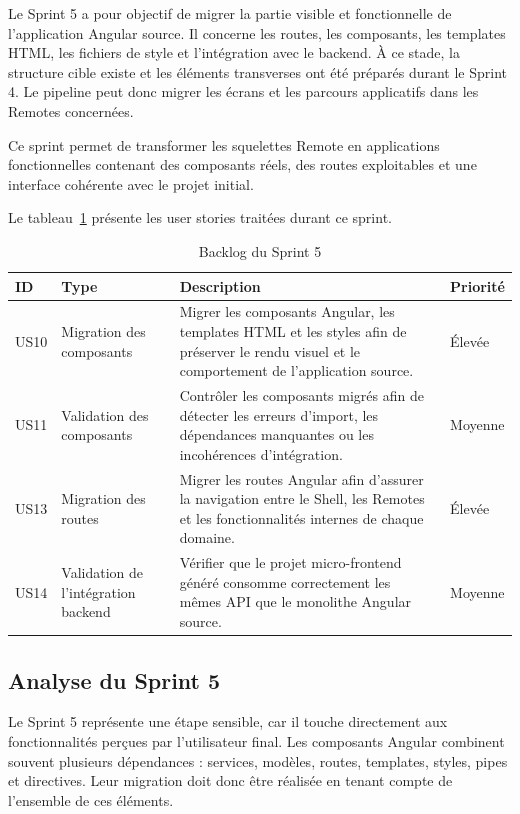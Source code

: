 Le Sprint 5 a pour objectif de migrer la partie visible et fonctionnelle de l'application Angular source. Il concerne les routes, les composants, les templates HTML, les fichiers de style et l'intégration avec le backend. À ce stade, la structure cible existe et les éléments transverses ont été préparés durant le Sprint 4. Le pipeline peut donc migrer les écrans et les parcours applicatifs dans les Remotes concernées.

Ce sprint permet de transformer les squelettes Remote en applications fonctionnelles contenant des composants réels, des routes exploitables et une interface cohérente avec le projet initial.

Le tableau~\ref{tab:backlog-sprint5-release2} présente les user stories traitées durant ce sprint.

\begingroup
\renewcommand{\arraystretch}{1.12}
\setlength{\tabcolsep}{4pt}
\begin{longtable}{|p{1.0cm}|p{3.1cm}|p{6.55cm}|p{1.55cm}|}
\caption{Backlog du Sprint 5}\label{tab:backlog-sprint5-release2}\\
\hline
\textbf{ID} & \textbf{Type} & \textbf{Description} & \textbf{Priorité} \\
\hline
US10 & Migration des composants & Migrer les composants Angular, les templates HTML et les styles afin de préserver le rendu visuel et le comportement de l'application source. & Élevée \\
\hline
US11 & Validation des composants & Contrôler les composants migrés afin de détecter les erreurs d'import, les dépendances manquantes ou les incohérences d'intégration. & Moyenne \\
\hline
US13 & Migration des routes & Migrer les routes Angular afin d'assurer la navigation entre le Shell, les Remotes et les fonctionnalités internes de chaque domaine. & Élevée \\
\hline
US14 & Validation de l'intégration backend & Vérifier que le projet micro-frontend généré consomme correctement les mêmes API que le monolithe Angular source. & Moyenne \\
\hline
\end{longtable}
\endgroup

\subsection{Analyse du Sprint 5}

Le Sprint 5 représente une étape sensible, car il touche directement aux fonctionnalités perçues par l'utilisateur final. Les composants Angular combinent souvent plusieurs dépendances : services, modèles, routes, templates, styles, pipes et directives. Leur migration doit donc être réalisée en tenant compte de l'ensemble de ces éléments.

